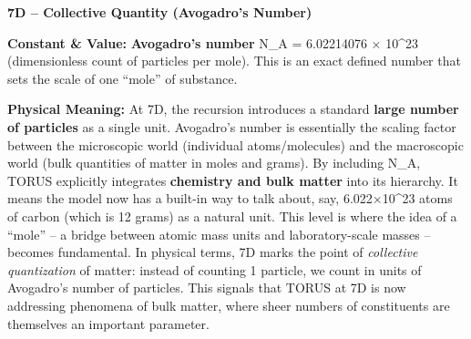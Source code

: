 \documentclass[
]{article}
\begin{document}
{\textbf{7D -- Collective Quantity (Avogadro's Number)}

\textbf{Constant \& Value:} \textbf{Avogadro's number} N\_A = 6.02214076
× 10\^{}23 (dimensionless count of particles per mole)\hspace{0pt}. This
is an exact defined number that sets the scale of one ``mole'' of
substance.

\textbf{Physical Meaning:} At 7D, the recursion introduces a standard
\textbf{large number of particles} as a single unit. Avogadro's number
is essentially the scaling factor between the microscopic world
(individual atoms/molecules) and the macroscopic world (bulk quantities
of matter in moles and grams)\hspace{0pt}. By including N\_A, TORUS
explicitly integrates \textbf{chemistry and bulk matter} into its
hierarchy. It means the model now has a built-in way to talk about, say,
6.022×10\^{}23 atoms of carbon (which is 12 grams) as a natural unit.
This level is where the idea of a ``mole'' -- a bridge between atomic
mass units and laboratory-scale masses -- becomes fundamental. In
physical terms, 7D marks the point of \emph{collective quantization} of
matter: instead of counting 1 particle, we count in units of Avogadro's
number of particles. This signals that TORUS at 7D is now addressing
phenomena of bulk matter, where sheer numbers of constituents are
themselves an important parameter.

}
\end{document}

